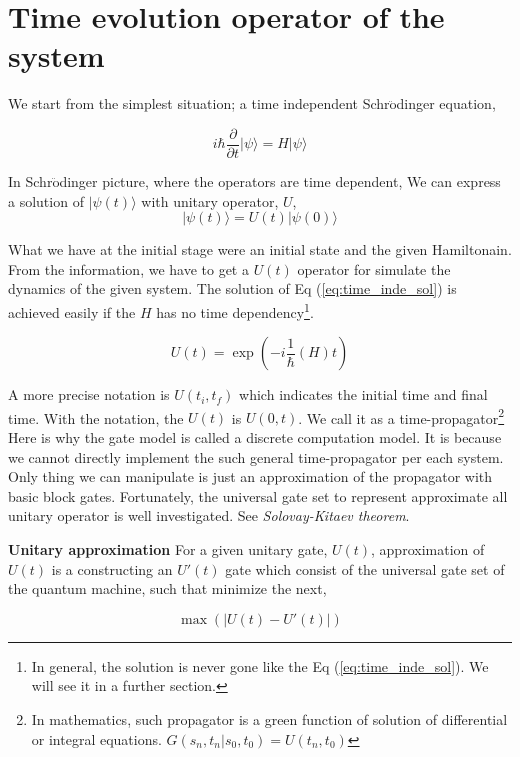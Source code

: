 \section{Time evolution operator of the system}

We start from the simplest situation; a time independent Schr$\ddot{\mbox{o}}$dinger equation,

\begin{equation*}
    i \hbar \frac{\partial }{\partial t} | \psi \rangle = H | \psi \rangle
\end{equation*}

In Schr$\ddot{\mbox{o}}$dinger picture, where the operators are time dependent,
We can express a solution of $|\psi(t) \rangle$ with unitary operator, $U$,
\begin{equation}
    \label{eq:time_inde_sol}
    |\psi(t)\rangle = U(t) | \psi(0)\rangle 
\end{equation}

What we have at the initial stage were an initial state and the given Hamiltonain.
From the information, we have to get a $U(t)$ operator for simulate
the dynamics of the given system.
The solution of Eq (\ref{eq:time_inde_sol}) is achieved easily 
if the $H$ has no time dependency\footnote{
    In general, the solution is never gone like the Eq (\ref{eq:time_inde_sol}). 
    We will see it in a further section.}.

\begin{equation}
    U(t) = \exp( -i \frac{1}{\hbar} (H) t)
\end{equation}

A more precise notation is $U(t_i, t_f)$ which indicates the initial time and final time.
With the notation, the $U(t)$ is $U(0, t)$.
We call it as a time-propagator\footnote{
    In mathematics, such propagator is a green function of solution of differential or integral equations.
    $G(s_n, t_n | s_0, t_0) = U(t_n, t_0)$
}
Here is why the gate model is called a discrete computation model.
It is because we cannot directly implement the such general time-propagator 
per each system. Only thing we can manipulate is just an approximation 
of the propagator with basic block gates. 
Fortunately, the universal gate set to represent approximate all unitary operator
is well investigated. See \textit{Solovay-Kitaev theorem}.


\begin{definition}\textbf{Unitary approximation}
    For a given unitary gate, $U(t)$, 
    approximation of $U(t)$ is a constructing an $U'(t)$ gate 
    which consist of the universal gate set of the quantum machine,
    such that minimize the next,

    \begin{equation}
        \max\left(|U(t) - U'(t)|\right)
    \end{equation}
\end{definition}

